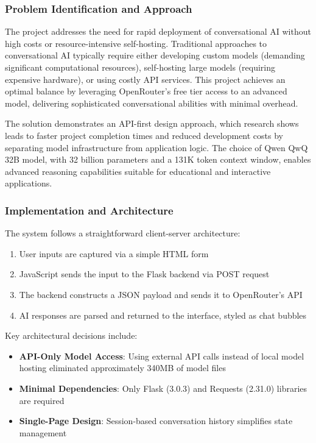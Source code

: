 \documentclass[12pt,a4paper]{article}
\begin{document}
\subsubsection{Problem Identification and Approach}
The project addresses the need for rapid deployment of conversational AI without high costs or resource-intensive self-hosting. Traditional approaches to conversational AI typically require either developing custom models (demanding significant computational resources), self-hosting large models (requiring expensive hardware), or using costly API services. This project achieves an optimal balance by leveraging OpenRouter's free tier access to an advanced model, delivering sophisticated conversational abilities with minimal overhead.

The solution demonstrates an API-first design approach, which research shows leads to faster project completion times and reduced development costs by separating model infrastructure from application logic. The choice of Qwen QwQ 32B model, with 32 billion parameters and a 131K token context window, enables advanced reasoning capabilities suitable for educational and interactive applications.

\subsubsection{Implementation and Architecture}
The system follows a straightforward client-server architecture:
\begin{enumerate}
    \item User inputs are captured via a simple HTML form
    \item JavaScript sends the input to the Flask backend via POST request
    \item The backend constructs a JSON payload and sends it to OpenRouter's API
    \item AI responses are parsed and returned to the interface, styled as chat bubbles
\end{enumerate}

Key architectural decisions include:
\begin{itemize}
    \item \textbf{API-Only Model Access}: Using external API calls instead of local model hosting eliminated approximately 340MB of model files
    \item \textbf{Minimal Dependencies}: Only Flask (3.0.3) and Requests (2.31.0) libraries are required
    \item \textbf{Single-Page Design}: Session-based conversation history simplifies state management
\end{itemize}
\end{document}
